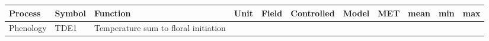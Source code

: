 \documentclass[a4paper]{article}
\begin{document}
\footnotesize

\begin{longtable}[]{@{}llllccccrrr@{}}
\toprule
\begin{minipage}[b]{0.08\columnwidth}\raggedright\strut
Process\strut
\end{minipage} & \begin{minipage}[b]{0.05\columnwidth}\raggedright\strut
Symbol\strut
\end{minipage} & \begin{minipage}[b]{0.19\columnwidth}\raggedright\strut
Function\strut
\end{minipage} & \begin{minipage}[b]{0.06\columnwidth}\raggedright\strut
Unit\strut
\end{minipage} & \begin{minipage}[b]{0.06\columnwidth}\centering\strut
Field\strut
\end{minipage} & \begin{minipage}[b]{0.08\columnwidth}\centering\strut
Controlled\strut
\end{minipage} & \begin{minipage}[b]{0.05\columnwidth}\centering\strut
Model\strut
\end{minipage} & \begin{minipage}[b]{0.04\columnwidth}\centering\strut
MET\strut
\end{minipage} & \begin{minipage}[b]{0.04\columnwidth}\raggedleft\strut
mean\strut
\end{minipage} & \begin{minipage}[b]{0.04\columnwidth}\raggedleft\strut
min\strut
\end{minipage} & \begin{minipage}[b]{0.04\columnwidth}\raggedleft\strut
max\strut
\end{minipage}\tabularnewline
\midrule
\endhead
\begin{minipage}[t]{0.08\columnwidth}\raggedright\strut
Phenology\strut
\end{minipage} & \begin{minipage}[t]{0.05\columnwidth}\raggedright\strut
TDE1\strut
\end{minipage} & \begin{minipage}[t]{0.19\columnwidth}\raggedright\strut
Temperature sum to floral initiation\strut
\end{minipage} & \begin{minipage}[t]{0.06\columnwidth}\raggedright\strut

\end{minipage}
\end{longtable}
\end{document}
